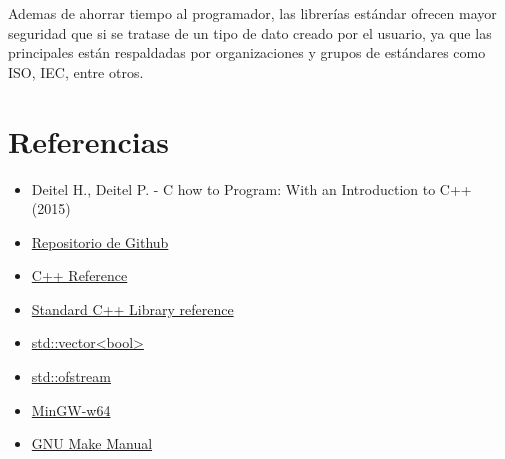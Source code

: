 \documentclass[12pt]{article}
\begin{document}
Ademas de ahorrar tiempo al programador, las librerías estándar ofrecen mayor
seguridad que si se tratase de un tipo de dato creado por el usuario, ya que las
principales están respaldadas por organizaciones y grupos de estándares como
ISO, IEC, entre otros.

\pagebreak
\section{Referencias}

\begin{itemize}
    \item Deitel H., Deitel P. - C how to Program: With an Introduction to C++
        (2015)
    \item
        \href{https://github.com/mjkloeckner/CB100}{Repositorio de Github}
    \item
        \href{https://en.cppreference.com/w/}{C++ Reference}
    \item
        \href{https://cplusplus.com/reference/}{Standard C++ Library reference}
    \item
        \href{https://en.cppreference.com/w/cpp/container/vector_bool}{
            std::vector\textless bool\textgreater}
    \item
        \href{https://cplusplus.com/reference/fstream/ofstream/}{std::ofstream}
    \item
        \href{https://www.mingw-w64.org/}{MinGW-w64}
    \item
        \href{https://www.gnu.org/software/make/manual/html_node/index.html}{GNU
        Make Manual}
\end{itemize}
\end{document}
